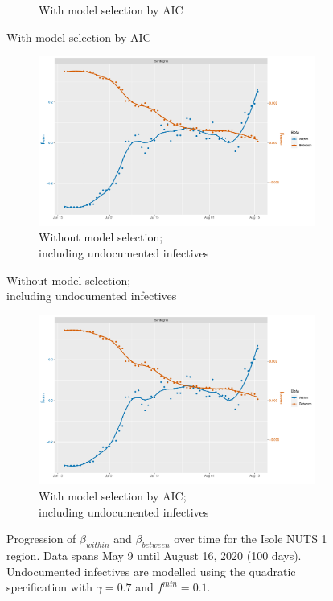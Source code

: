 \documentclass[12pt]{article}
\begin{document}
\begin{appendices}
\begin{figure}[H]
\begin{subfigure}{\textwidth}
    	      \caption{With model selection by AIC}
    	      \label{fig:beta_between_over_time_isole_aic}
    	    \end{subfigure}
    	\end{figure}
        \begin{figure}[H]\ContinuedFloat
    	    \begin{subfigure}{\textwidth}
    	      \centering
    	      \includegraphics[width=0.8\linewidth]{output/model_between_lag14_betas_Isole_UndocQuadratic_rolling.pdf}
    	      \caption{Without model selection; \\ including undocumented infectives}
    	      \label{fig:beta_between_over_time_isole_regular_undoc}
    	    \end{subfigure}
        \end{figure}
        \begin{figure}[H]\ContinuedFloat
    	    \begin{subfigure}{\textwidth}
    	      \centering
    	      \includegraphics[width=0.8\linewidth]{output/model_between_lag14_betas_Isole_aic_UndocQuadratic_rolling.pdf}
    	      \caption{With model selection by AIC; \\ including undocumented infectives}
    	      \label{fig:beta_between_over_time_isole_aic_undoc}
    	    \end{subfigure}
    	    \caption{Progression of $\beta_{within}$ and $\beta_{between}$ over time for the Isole NUTS 1 region. Data spans May 9 until August 16, 2020 (100 days). Undocumented infectives are modelled using the quadratic specification with $\gamma = 0.7$ and $f^{min}=0.1$.}
    	    \label{fig:beta_between_over_time_isole}
        \end{figure}
		

\end{appendices}
\end{document}
